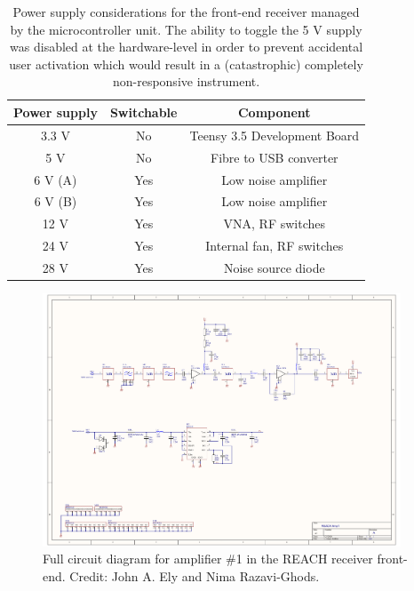 \begin{table}
    \centering
    \begin{tabular}{ |c|c|c| }
        \hline
        Power supply & Switchable & Component \\
        \hline
        3.3 V & No & Teensy 3.5 Development Board \\
        5 V & No & Fibre to USB converter \\
        6 V (A) & Yes & Low noise amplifier \\
        6 V (B) & Yes & Low noise amplifier \\
        12 V & Yes & VNA, RF switches \\
        24 V & Yes & Internal fan, RF switches \\
        28 V & Yes & Noise source diode \\
        \hline
    \end{tabular}
    \caption{Power supply considerations for the front-end receiver managed by the microcontroller unit. The ability to toggle the 5 V supply was disabled at the hardware-level in order to prevent accidental user activation which would result in a (catastrophic) completely non-responsive instrument.}
    \label{tab:power_supply}
\end{table}

\begin{figure}
    \centering
    \includegraphics[angle=90,width=0.95\textwidth]{amp1_schematic}
    \caption{Full circuit diagram for amplifier \#1 in the REACH receiver front-end. Credit: John A. Ely and Nima Razavi-Ghods.}
    \label{fig:amp1_schematic}
\end{figure}

